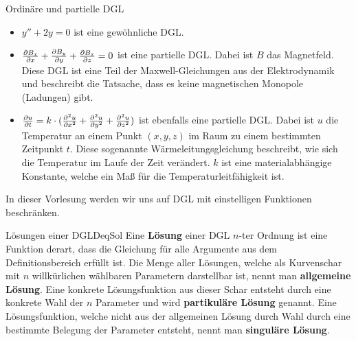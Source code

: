 \begin{example}{Ordinäre und partielle DGL}{}
    \begin{itemize}
        \item $y''+2y=0$ ist eine gewöhnliche DGL.
        \item $\frac{\partial B_x}{\partial x} + \frac{\partial B_y}{\partial y} + \frac{\partial B_z}{\partial z} = 0$ ist eine partielle DGL. Dabei ist $B$ das Magnetfeld. Diese DGL ist eine Teil der Maxwell-Gleichungen aus der Elektrodynamik und beschreibt die Tatsache, dass es keine magnetischen Monopole (Ladungen) gibt.
        \item $\frac{\partial u}{\partial t} = k \cdot (\frac{\partial^{2} u}{\partial x^{2}} + \frac{\partial^{2} u}{\partial y^{2}} + \frac{\partial^{2} u}{\partial z^{2}})$ ist ebenfalls eine partielle DGL. Dabei ist $u$ die Temperatur an einem Punkt $(x,y,z)$ im Raum zu einem bestimmten Zeitpunkt $t$. Diese sogenannte Wärmeleitungsgleichung beschreibt, wie sich die Temperatur im Laufe der Zeit verändert. $k$ ist eine materialabhängige Konstante, welche ein Maß für die Temperaturleitfähigkeit ist.
    \end{itemize}
\end{example}

In dieser Vorlesung werden wir uns auf DGL mit einstelligen Funktionen beschränken.

\begin{definition}{Lösungen einer DGL}{DeqSol}
    Eine \textbf{Lösung} einer DGL $n$-ter Ordnung ist eine Funktion derart, dass die Gleichung für alle Argumente aus dem Definitionsbereich erfüllt ist. Die Menge aller Lösungen, welche als Kurvenschar mit $n$ willkürlichen wählbaren Parametern darstellbar ist, nennt man \textbf{allgemeine Lösung}. Eine konkrete Lösungsfunktion aus dieser Schar entsteht durch eine konkrete Wahl der $n$ Parameter und wird \textbf{partikuläre Lösung} genannt. Eine Lösungsfunktion, welche nicht aus der allgemeinen Lösung durch Wahl durch eine bestimmte Belegung der Parameter entsteht, nennt man \textbf{singuläre Lösung}.
\end{definition}

